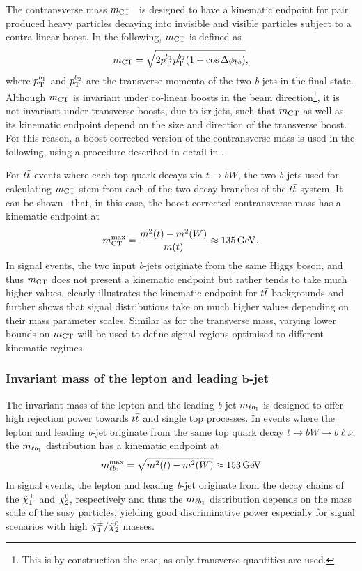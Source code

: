 The contransverse mass $m_{\textrm{CT}}$~\cite{Tovey:2008ui} is designed to have a kinematic endpoint for pair produced heavy particles decaying into invisible and visible particles subject to a contra-linear boost. In the following, $m_{\textrm{CT}}$ is defined as
\begin{equation}
	m_{\textrm{CT}} = \sqrt{2p_{\textrm{T}}^{b_1}p_{\textrm{T}}^{b_2}(1+\cos\Delta\phi_{bb})},
\end{equation}
where $p_{\textrm{T}}^{b_1}$ and $p_{\textrm{T}}^{b_2}$ are the transverse momenta of the two \textit{b}-jets in the final state. Although $m_{\textrm{CT}}$ is invariant under co-linear boosts in the beam direction\footnote{This is by construction the case, as only transverse quantities are used.}, it is not invariant under transverse boosts, \eg due to \gls{isr} jets, such that $m_{\textrm{CT}}$ as well as its kinematic endpoint depend on the size and direction of the transverse boost. For this reason, a boost-corrected version of the contransverse mass is used in the following, using a procedure described in detail in \cite{Polesello:2009rn}. 

For $t\bar{t}$ events where each top quark decays via $t\rightarrow bW$, the two \textit{b}-jets used for calculating $m_{\textrm{CT}}$ stem from each of the two decay branches of the $t\bar{t}$ system. It can be shown~\cite{Polesello:2009rn} that, in this case, the boost-corrected contransverse mass has a kinematic endpoint at
\begin{equation}
	\mct^\mathrm{max} = \frac{m^2(t) - m^2(W)}{m(t)} \approx \SI{135}{\GeV}.
\end{equation}
In signal events, the two input \textit{b}-jets originate from the same Higgs boson, and thus $m_{\textrm{CT}}$ does not present a kinematic endpoint but rather tends to take much higher values.  clearly illustrates the kinematic endpoint for $t\bar{t}$ backgrounds and further shows that signal distributions take on much higher values depending on their mass parameter scales. Similar  as for the transverse mass, varying lower bounds on $m_{\textrm{CT}}$ will be used to define signal regions optimised to different kinematic regimes. 

\subsubsection[Invariant mass of the lepton and leading \textit{b}-jet]{Invariant mass of the lepton and leading $\boldsymbol{b}$-jet}

The invariant mass of the lepton and the leading \textit{b}-jet $m_{\ell b_{1}}$ is designed to offer high rejection power towards $t\bar{t}$ and single top processes. In events where the lepton and leading \textit{b}-jet originate from the same top quark decay $t\rightarrow bW \rightarrow b\ell\nu$, the $m_{\ell b_{1}}$ distribution has a kinematic endpoint at 
\begin{equation}
	\mlb^\mathrm{max} = \sqrt{m^2(t)-m^2(W)} \approx \SI{153}{\GeV} 
\end{equation}
In signal events, the lepton and leading \textit{b}-jet originate from the decay chains of the $\tilde{\chi}_1^\pm$ and $\tilde{\chi}_2^0$, respectively and thus the $m_{\ell b_{1}}$ distribution depends on the mass scale of the \gls{susy} particles, yielding good discriminative power especially for signal scenarios with high $\tilde{\chi}_1^\pm/\tilde{\chi}_2^0$ masses.

